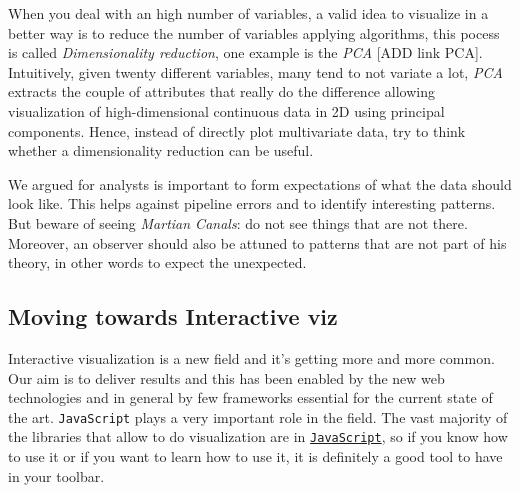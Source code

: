 When you deal with an high number of variables, a valid idea to visualize in a better way is to reduce the number of variables applying algorithms, this pocess is called \emph{Dimensionality reduction}, one example is the \emph{PCA} [ADD link PCA]. Intuitively, given twenty different variables, many tend to not variate a lot, \emph{PCA} extracts the couple of attributes that really do the difference allowing visualization of high-dimensional continuous data in 2D using principal components. Hence, instead of directly plot multivariate data, try to think whether a dimensionality reduction can be useful.

We argued for analysts is important to form expectations of what the data should look like. This helps against pipeline errors and to identify interesting patterns. But beware of seeing \emph{Martian Canals}: do not see things that are not there. Moreover, an observer should also be attuned to patterns that are not part of his theory, in other words to expect the unexpected. 


\subsection{Moving towards Interactive viz}

Interactive visualization is a new field and it's getting more and more common. Our aim is to deliver results and this has been enabled by the new web technologies and in general by few frameworks essential for the current state of the art. \texttt{JavaScript} plays a very important role in the field. The vast majority of the libraries that allow to do visualization are in \href{https://www.codecademy.com/learn/javascript}{\texttt{JavaScript}}, so if you know how to use it or if you want to learn how to use it, it is definitely a good tool to have in your toolbar. 











